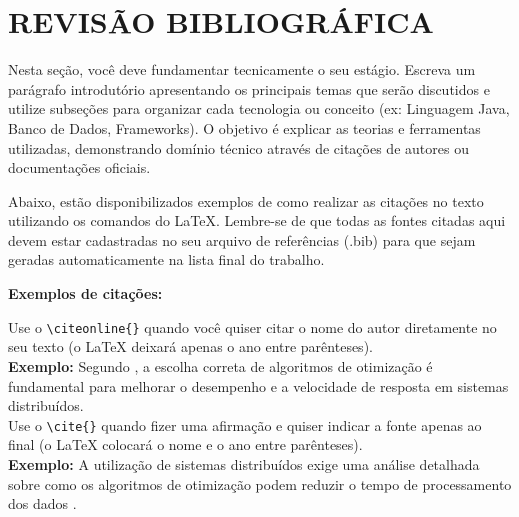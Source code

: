 
\chapter{REVISÃO BIBLIOGRÁFICA} 
\label{ch:revisao-bibliografica}

Nesta seção, você deve fundamentar tecnicamente o seu estágio. 
Escreva um parágrafo introdutório apresentando os principais temas que 
serão discutidos e utilize subseções para organizar cada tecnologia ou 
conceito (ex: Linguagem Java, Banco de Dados, Frameworks). 
O objetivo é explicar as teorias e ferramentas utilizadas, demonstrando 
domínio técnico através de citações de autores ou documentações oficiais.


Abaixo, estão disponibilizados exemplos de como realizar as citações no texto utilizando os comandos do LaTeX.
Lembre-se de que todas as fontes citadas aqui devem estar cadastradas no seu arquivo de referências (.bib) 
para que sejam geradas automaticamente na lista final do trabalho.

\textbf{Exemplos de citações:}

Use o \texttt{\textbackslash citeonline\{\}} quando você quiser citar o nome do autor
 diretamente no seu texto (o LaTeX deixará apenas o ano entre parênteses).\\
 \textbf{Exemplo:} Segundo , a escolha correta de algoritmos de otimização é fundamental para melhorar o desempenho e a velocidade de resposta em sistemas distribuídos.\\

Use o \texttt{\textbackslash cite\{\}} quando fizer uma afirmação e quiser indicar a fonte apenas ao final (o LaTeX colocará o nome e o ano entre parênteses).\\
\textbf{Exemplo:} A utilização de sistemas distribuídos exige uma análise detalhada sobre como os algoritmos de otimização podem reduzir o tempo de processamento dos dados \cite{almeida2022}.

